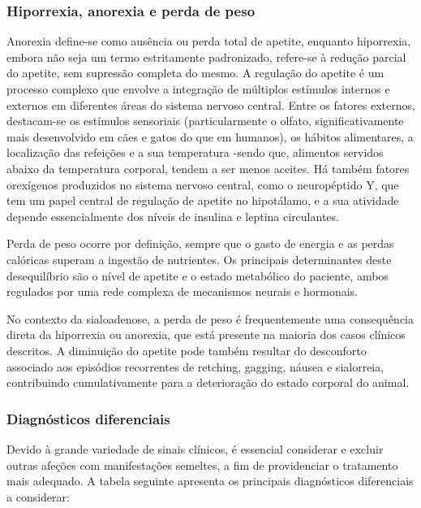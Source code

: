 \subsubsection{Hiporrexia, anorexia e perda de peso}

Anorexia define-se como ausência ou perda total de apetite, enquanto hiporrexia, embora não seja um termo estritamente padronizado, refere-se à redução parcial do apetite, sem supressão completa do mesmo. \cite{Delaney2006}
A regulação do apetite é um processo complexo que envolve a integração de múltiplos estímulos internos e externos em diferentes áreas do sistema nervoso central. \cite{_canine_gastro_2013}Entre os fatores externos, destacam-se os estímulos sensoriais (particularmente o olfato, significativamente mais desenvolvido em cães e gatos do que em humanos), os hábitos alimentares, a localização das refeições e a sua temperatura -sendo que, alimentos servidos abaixo da temperatura corporal, tendem a ser menos aceites. \cite{_canine_gastro_2013}
Há também fatores orexígenos produzidos no sistema nervoso central, como o neuropéptido Y, que tem um papel central de regulação de apetite no hipotálamo, e a sua atividade depende essencialmente dos níveis de insulina e leptina circulantes. \cite{_canine_gastro_2013}


Perda de peso ocorre por definição, sempre que o gasto de energia e as perdas calóricas superam a ingestão de nutrientes. Os principais determinantes deste desequilíbrio são o nível de apetite e o estado metabólico do paciente, ambos regulados por uma rede complexa de mecanismos neurais e hormonais. \cite{_canine_gastro_2013}


No contexto da sialoadenose, a perda de peso é frequentemente uma consequência direta da hiporrexia ou anorexia, que está presente na maioria dos casos clínicos descritos. A diminuição do apetite pode também resultar do desconforto associado aos episódios recorrentes de retching, gagging, náusea e sialorreia, contribuindo cumulativamente para a deterioração do estado corporal do animal.

\subsubsection{Diagnósticos diferenciais}

Devido à grande variedade de sinais clínicos, é essencial considerar e excluir outras afeções com manifestações semel\cite{Han2016}tes, a fim de providenciar o tratamento mais adequado. A tabela seguinte apresenta os principais diagnósticos diferenciais a considerar:

